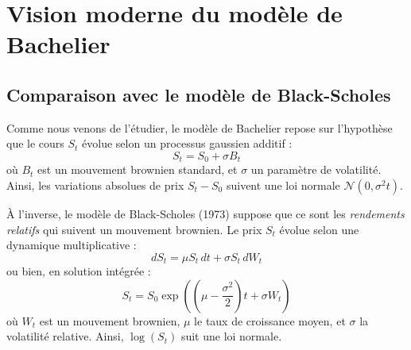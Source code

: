 \documentclass[12pt,a4paper]{article}
\begin{document}
\section{Vision moderne du modèle de Bachelier}

\subsection{Comparaison avec le modèle de Black-Scholes}

Comme nous venons de l'étudier, le modèle de Bachelier repose sur l’hypothèse que le cours $S_t$ évolue selon un processus gaussien additif :
\[
S_t = S_0 + \sigma B_t
\]
où $B_t$ est un mouvement brownien standard, et $\sigma$ un paramètre de volatilité. Ainsi, les variations absolues de prix $S_t - S_0$ suivent une loi normale $\mathcal{N}(0, \sigma^2 t)$.

À l’inverse, le modèle de Black-Scholes (1973) suppose que ce sont les \textit{rendements relatifs} qui suivent un mouvement brownien. Le prix $S_t$ évolue selon une dynamique multiplicative :
\[
dS_t = \mu S_t\, dt + \sigma S_t\, dW_t
\]
ou bien, en solution intégrée :
\[
S_t = S_0 \exp\left( \left(\mu - \frac{\sigma^2}{2} \right)t + \sigma W_t \right)
\]
où $W_t$ est un mouvement brownien, $\mu$ le taux de croissance moyen, et $\sigma$ la volatilité relative. Ainsi, $\log(S_t)$ suit une loi normale.

\begin{table}[h]
    \centering
    \caption{Comparaison entre les modèles de Bachelier et de Black-Scholes}
\end{table}
\end{document}
